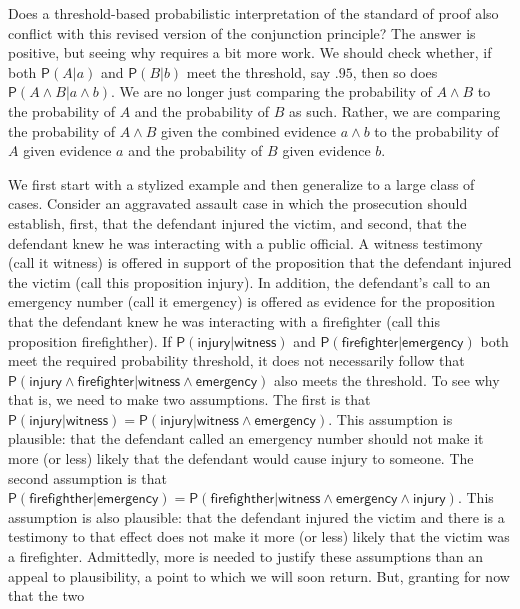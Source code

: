 \documentclass[
  10pt,
  dvipsnames,enabledeprecatedfontcommands]{scrartcl}
\newcommand{\pr}[1]{\ensuremath{\mathsf{P}(#1)}}
\begin{document}
Does a threshold-based probabilistic interpretation of the standard of
proof also conflict with this revised version of the conjunction
principle? The answer is positive, but seeing why requires a bit more
work. We should check whether, if both \(\pr{A \vert a}\) and
\(\pr{B \vert b}\) meet the threshold, say \(.95\), then so does
\(\pr{A\wedge B \vert a\wedge b}\). We are no longer just comparing the
probability of \(A\wedge B\) to the probability of \(A\) and the
probability of \(B\) as such. Rather, we are comparing the probability
of \(A \wedge B\) given the combined evidence \(a \wedge b\) to the
probability of \(A\) given evidence \(a\) and the probability of \(B\)
given evidence \(b\).

We first start with a stylized example and then generalize to a large
class of cases. Consider an aggravated assault case in which the
prosecution should establish, first, that the defendant injured the
victim, and second, that the defendant knew he was interacting with a
public official. A witness testimony (call it \textsf{witness}) is
offered in support of the proposition that the defendant injured the
victim (call this proposition \textsf{injury}). In addition, the
defendant's call to an emergency number (call it \textsf{emergency}) is
offered as evidence for the proposition that the defendant knew he was
interacting with a firefighter (call this proposition
\textsf{firefighther}). If
\(\pr{\textsf{injury} \vert \textsf{witness}}\) and
\(\pr{\textsf{firefighter} \vert \textsf{emergency} }\) both meet the
required probability threshold, it does not necessarily follow that
\(\pr{\textsf{injury} \wedge \textsf{firefighter} \vert \textsf{witness} \wedge \textsf{emergency}}\)
also meets the threshold. To see why that is, we need to make two
assumptions. The first is that
\(\pr{\textsf{injury} \vert \textsf{witness}}=\pr{\textsf{injury} \vert \textsf{witness} \wedge \textsf{emergency}}\).
This assumption is plausible: that the defendant called an emergency
number should not make it more (or less) likely that the defendant would
cause injury to someone. The second assumption is that
\(\pr{\textsf{firefighther} \vert \textsf{emergency} }=\pr{\textsf{firefighther} \vert \textsf{witness} \wedge \textsf{emergency} \wedge \textsf{injury}}\).
This assumption is also plausible: that the defendant injured the victim
and there is a testimony to that effect does not make it more (or less)
likely that the victim was a firefighter. Admittedly, more is needed to
justify these assumptions than an appeal to plausibility, a point to
which we will soon return. But, granting for now that the two
\end{document}

